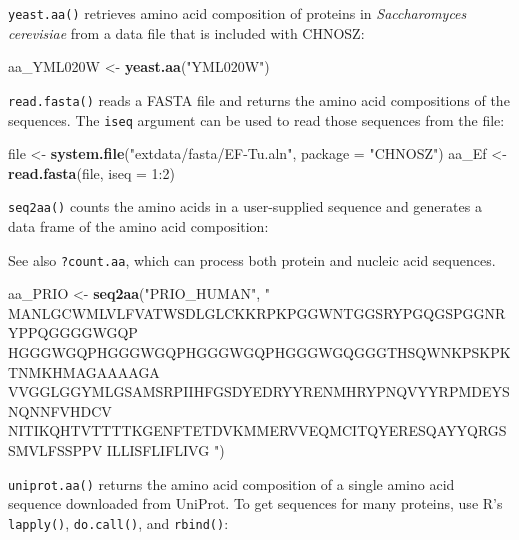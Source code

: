 \documentclass[]{tufte-book}
\newenvironment{Shaded}{}{}
\newcommand{\KeywordTok}[1]{\textcolor[rgb]{0.00,0.44,0.13}{\textbf{#1}}}
\newcommand{\DataTypeTok}[1]{\textcolor[rgb]{0.56,0.13,0.00}{#1}}
\newcommand{\DecValTok}[1]{\textcolor[rgb]{0.25,0.63,0.44}{#1}}
\newcommand{\StringTok}[1]{\textcolor[rgb]{0.25,0.44,0.63}{#1}}
\newcommand{\OperatorTok}[1]{\textcolor[rgb]{0.40,0.40,0.40}{#1}}
\newcommand{\NormalTok}[1]{#1}
\begin{document}
{\texttt{yeast.aa()}} retrieves amino acid composition of proteins in
\emph{Saccharomyces cerevisiae} from a data file that is included with
CHNOSZ:

\begin{Shaded}
\begin{Highlighting}[]
\NormalTok{aa_YML020W <-}\StringTok{ }\KeywordTok{yeast.aa}\NormalTok{(}\StringTok{"YML020W"}\NormalTok{)}
\end{Highlighting}
\end{Shaded}

{\texttt{read.fasta()}} reads a FASTA file and returns the amino acid
compositions of the sequences. The \texttt{iseq} argument can be used to
read those sequences from the file:

\begin{Shaded}
\begin{Highlighting}[]
\NormalTok{file <-}\StringTok{ }\KeywordTok{system.file}\NormalTok{(}\StringTok{"extdata/fasta/EF-Tu.aln"}\NormalTok{, }\DataTypeTok{package =} \StringTok{"CHNOSZ"}\NormalTok{)}
\NormalTok{aa_Ef <-}\StringTok{ }\KeywordTok{read.fasta}\NormalTok{(file, }\DataTypeTok{iseq =} \DecValTok{1}\OperatorTok{:}\DecValTok{2}\NormalTok{)}
\end{Highlighting}
\end{Shaded}

{\texttt{seq2aa()}} counts the amino acids in a user-supplied sequence
and generates a data frame of the amino acid composition:

\begin{marginfigure}
See also {\texttt{?count.aa}}, which can process both protein and
nucleic acid sequences.
\end{marginfigure}

\begin{Shaded}
\begin{Highlighting}[]
\NormalTok{aa_PRIO <-}\StringTok{ }\KeywordTok{seq2aa}\NormalTok{(}\StringTok{"PRIO_HUMAN"}\NormalTok{, }\StringTok{"}
\StringTok{MANLGCWMLVLFVATWSDLGLCKKRPKPGGWNTGGSRYPGQGSPGGNRYPPQGGGGWGQP}
\StringTok{HGGGWGQPHGGGWGQPHGGGWGQPHGGGWGQGGGTHSQWNKPSKPKTNMKHMAGAAAAGA}
\StringTok{VVGGLGGYMLGSAMSRPIIHFGSDYEDRYYRENMHRYPNQVYYRPMDEYSNQNNFVHDCV}
\StringTok{NITIKQHTVTTTTKGENFTETDVKMMERVVEQMCITQYERESQAYYQRGSSMVLFSSPPV}
\StringTok{ILLISFLIFLIVG}
\StringTok{"}\NormalTok{)}
\end{Highlighting}
\end{Shaded}

{\texttt{uniprot.aa()}} returns the amino acid composition of a single
amino acid sequence downloaded from UniProt. To get sequences for many
proteins, use R's \texttt{lapply()}, \texttt{do.call()}, and
\texttt{rbind()}:
\end{document}
